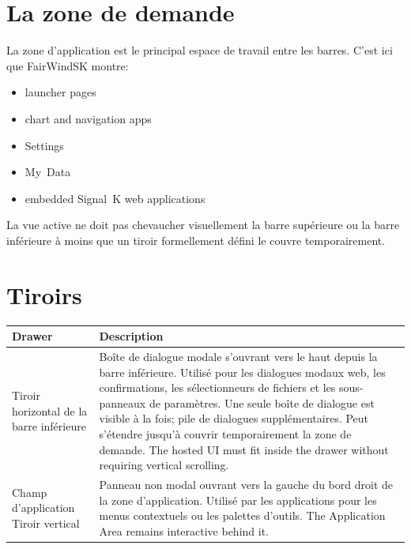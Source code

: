 
\section{La zone de demande}

La zone d'application est le principal espace de travail entre les barres.
C'est ici que FairWindSK montre:

\begin{itemize}
  \item launcher pages
  \item chart and navigation apps
  \item Settings
  \item My~Data
  \item embedded Signal~K web applications
\end{itemize}

La vue active ne doit pas chevaucher visuellement la barre supérieure ou la barre inférieure à moins que
un tiroir formellement défini le couvre temporairement.

\section{Tiroirs}

\begin{longtable}{L{4.0cm}L{9.7cm}}
\toprule
{}
\color{white}\sffamily\bfseries Drawer &
\color{white}\sffamily\bfseries Description \\
\midrule
Tiroir horizontal de la barre inférieure&
Boîte de dialogue modale s'ouvrant vers le haut depuis la barre inférieure.
Utilisé pour les dialogues modaux web, les confirmations, les sélectionneurs de fichiers et les sous-panneaux de paramètres.
Une seule boîte de dialogue est visible à la fois; pile de dialogues supplémentaires.
Peut s'étendre jusqu'à couvrir temporairement la zone de demande.
  The hosted UI must fit inside the drawer without requiring vertical scrolling. \\
Champ d'application Tiroir vertical&
Panneau non modal ouvrant vers la gauche du bord droit de la zone d'application.
Utilisé par les applications pour les menus contextuels ou les palettes d'outils.
  The Application Area remains interactive behind it. \\
\bottomrule
\end{longtable}

